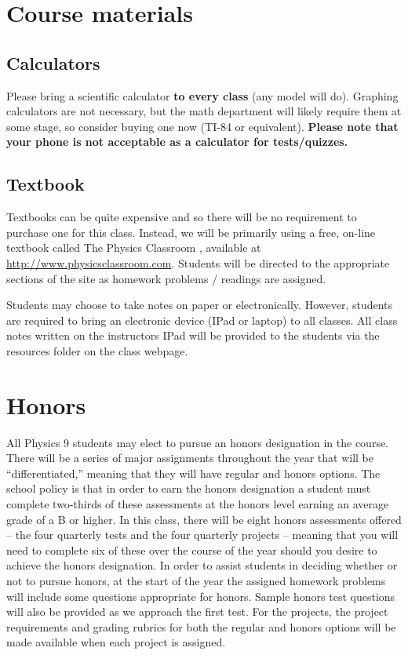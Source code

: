 \documentclass{article}
\begin{document}
\section{Course materials}
\subsection{Calculators} 
Please bring a scientific calculator \textbf{to every class} (any model will do). Graphing calculators are not necessary, but the math department will likely require them at some stage, so consider buying one now (TI-84 or equivalent). \textbf{Please note that your phone is not acceptable as a calculator for tests/quizzes.}

\subsection{Textbook}
Textbooks can be quite expensive and so there will be no requirement to purchase one for this class. Instead, we will be primarily using a free, on-line textbook called The Physics Classroom \citep{henderson2020physics}, available at \url{http://www.physicsclassroom.com}. Students will be directed to the appropriate sections of the site as homework problems / readings are assigned.

Students may choose to take notes on paper or electronically. However, students are required to bring an electronic device (IPad or laptop) to all classes. All class notes written on the instructors IPad will be provided to the students via the resources folder on the class webpage.

\section{Honors}
All Physics 9 students may elect to pursue an honors designation in the course. There will be a series of major assignments throughout the year that will be ``differentiated,'' meaning that they will have regular and honors options. The school policy is that in order to earn the honors designation a student must complete two-thirds of these assessments at the honors level earning an average grade of a B or higher. In this class, there will be eight honors assessments offered -- the four quarterly tests and the four quarterly projects -- meaning that you will need to complete six of these over the course of the year should you desire to achieve the honors designation. In order to assist students in deciding whether or not to pursue honors, at the start of the year the assigned homework problems will include some questions appropriate for honors. Sample honors test questions will also be provided as we approach the first test. For the projects, the project requirements and grading rubrics for both the regular and honors options will be made available when each project is assigned.
\end{document}
